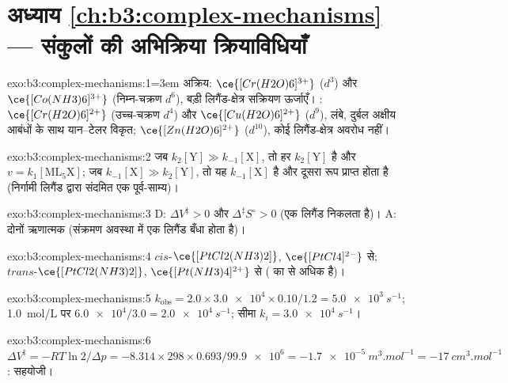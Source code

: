 \section*{अध्याय \ref{ch:b3:complex-mechanisms} --- संकुलों की अभिक्रिया क्रियाविधियाँ}

\begin{solution}{exo:b3:complex-mechanisms:1}\emergencystretch=3em
अक्रिय: $\ce{[Cr(H2O)6]^{3+}}$ ($d^3$) और $\ce{[Co(NH3)6]^{3+}}$ (निम्न-चक्रण $d^6$), बड़ी लिगैंड-क्षेत्र
सक्रियण ऊर्जाएँ। : $\ce{[Cr(H2O)6]^{2+}}$ (उच्च-चक्रण $d^4$) और $\ce{[Cu(H2O)6]^{2+}}$ ($d^9$),
लंबे, दुर्बल अक्षीय आबंधों के साथ यान--टेलर विकृत; $\ce{[Zn(H2O)6]^{2+}}$ ($d^{10}$), कोई लिगैंड-क्षेत्र
अवरोध नहीं।
\end{solution}

\begin{solution}{exo:b3:complex-mechanisms:2}
जब $k_2[\mathrm Y] \gg k_{-1}[\mathrm X]$, तो हर $k_2[\mathrm Y]$ है और $v = k_1[\mathrm{ML_5X}]$; जब $k_{-1}[\mathrm X] \gg k_2[\mathrm Y]$, तो यह
$k_{-1}[\mathrm X]$ है और दूसरा रूप प्राप्त होता है (निर्गामी लिगैंड द्वारा संदमित
एक पूर्व-साम्य)।
\end{solution}

\begin{solution}{exo:b3:complex-mechanisms:3}
D: $\Delta V^{\ddagger} > 0$ और $\Delta^{\ddagger}S^\circ > 0$ (एक लिगैंड निकलता है)। A: दोनों ऋणात्मक (संक्रमण अवस्था में
एक लिगैंड बँधा होता है)।
\end{solution}

\begin{solution}{exo:b3:complex-mechanisms:4}
$cis$-$\ce{[PtCl2(NH3)2]}$, $\ce{[PtCl4]^{2-}}$ से; $trans$-$\ce{[PtCl2(NH3)2]}$, $\ce{[Pt(NH3)4]^{2+}}$ से ( का
  से अधिक है)।
\end{solution}

\begin{solution}{exo:b3:complex-mechanisms:5}
$k_{\mathrm{obs}} = 2.0 \times \num{3.0e4} \times 0.10/1.2 = \qty{5.0e3}{s^{-1}}$; \qty{1.0}{mol/L} पर $\num{6.0e4}/3.0 = \qty{2.0e4}{s^{-1}}$; सीमा
$k_i = \qty{3.0e4}{s^{-1}}$।
\end{solution}

\begin{solution}{exo:b3:complex-mechanisms:6}
$\Delta V^{\ddagger} = -RT\ln2/\Delta p = -8.314 \times 298 \times 0.693/\num{99.9e6} = \qty{-1.7e-5}{m^3.mol^{-1}} = \qty{-17}{cm^3.mol^{-1}}$:
सहयोजी।
\end{solution}

